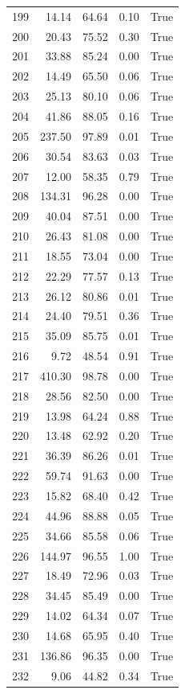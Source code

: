 \begin{longtable}{rrrrr}
199 & 14.14 & 64.64 & 0.10 & True \\
200 & 20.43 & 75.52 & 0.30 & True \\
201 & 33.88 & 85.24 & 0.00 & True \\
202 & 14.49 & 65.50 & 0.06 & True \\
203 & 25.13 & 80.10 & 0.06 & True \\
204 & 41.86 & 88.05 & 0.16 & True \\
205 & 237.50 & 97.89 & 0.01 & True \\
206 & 30.54 & 83.63 & 0.03 & True \\
207 & 12.00 & 58.35 & 0.79 & True \\
208 & 134.31 & 96.28 & 0.00 & True \\
209 & 40.04 & 87.51 & 0.00 & True \\
210 & 26.43 & 81.08 & 0.00 & True \\
211 & 18.55 & 73.04 & 0.00 & True \\
212 & 22.29 & 77.57 & 0.13 & True \\
213 & 26.12 & 80.86 & 0.01 & True \\
214 & 24.40 & 79.51 & 0.36 & True \\
215 & 35.09 & 85.75 & 0.01 & True \\
216 & 9.72 & 48.54 & 0.91 & True \\
217 & 410.30 & 98.78 & 0.00 & True \\
218 & 28.56 & 82.50 & 0.00 & True \\
219 & 13.98 & 64.24 & 0.88 & True \\
220 & 13.48 & 62.92 & 0.20 & True \\
221 & 36.39 & 86.26 & 0.01 & True \\
222 & 59.74 & 91.63 & 0.00 & True \\
223 & 15.82 & 68.40 & 0.42 & True \\
224 & 44.96 & 88.88 & 0.05 & True \\
225 & 34.66 & 85.58 & 0.06 & True \\
226 & 144.97 & 96.55 & 1.00 & True \\
227 & 18.49 & 72.96 & 0.03 & True \\
228 & 34.45 & 85.49 & 0.00 & True \\
229 & 14.02 & 64.34 & 0.07 & True \\
230 & 14.68 & 65.95 & 0.40 & True \\
231 & 136.86 & 96.35 & 0.00 & True \\
232 & 9.06 & 44.82 & 0.34 & True \\

\end{longtable}
